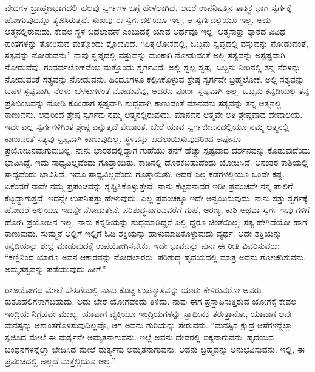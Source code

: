ವೇದಗಳ ಬ್ರಾಹ್ಮಣಭಾಗದಲ್ಲಿ ಹಲವು ಸ್ವರ್ಗಗಳ ಬಗ್ಗೆ ಹೇಳಲಾಗಿದೆ. ಆದರೆ ಉಪನಿಷತ್ತಿನ ತಾತ್ತ್ವಿಕ ಭಾಗ ಸ್ವರ್ಗಕ್ಕೆ ಹೋಗುವುದನ್ನೂ ತ್ಯಜಿಸಿರುತ್ತದೆ. ಸುಖವು ಈ ಸ್ವರ್ಗದಲ್ಲಿಯೂ ಇಲ್ಲ, ಆ ಸ್ವರ್ಗದಲ್ಲಿಯೂ ಇಲ್ಲ. ಅದು ಆತ್ಮನಲ್ಲಿರುವುದು. ಕೇವಲ ಸ್ಥಳ ಬದಲಾವಣೆ ಎಂಬುದಕ್ಕೆ ಯಾವ ಅರ್ಥವೂ ಇಲ್ಲ. ಆತ್ಮಸಾಕ್ಷಾ ತ್ಕಾರದ ವಿವಿಧ ಹಂತಗಳನ್ನು ತೋರಿಸುವ ಮತ್ತೊಂದು ಶ್ಲೋಕವಿದೆ. “ಪಿತೃಲೋಕದಲ್ಲಿ, ಒಬ್ಬನು ಸ್ವಪ್ನದಲ್ಲಿ ವಸ್ತುವನ್ನು ನೋಡುವಂತೆ, ಸತ್ಯವನ್ನು ನೋಡುವನು.” ನಾವು ಸ್ವಪ್ನದಲ್ಲಿ ವಸ್ತುವನ್ನು ಮಂಕಾಗಿ ನೋಡುವಂತೆ ಅಲ್ಲಿ ಸತ್ಯವನ್ನು ಅಸ್ಪಷ್ಟವಾಗಿ ನೋಡುವೆವು. ಗಂಧರ್ವಲೋಕವೆಂಬ ಮತ್ತೊಂದು ಸ್ವರ್ಗವಿದೆ. ಅಲ್ಲಿ ಸ್ವಲ್ಪ ಸ್ವಷ್ಪ; ಒಬ್ಬನು ನೀರಿನಲ್ಲಿ ತನ್ನ ನೆರಳನ್ನು ನೋಡುವಂತೆ ಸತ್ಯವನ್ನು ನೋಡುವನು. ಹಿಂದೂಗಳೂ ಕಲ್ಪಿಸಿಕೊಳ್ಳುವ ಶ್ರೇಷ್ಠ ಸ್ವರ್ಗವೇ ಬ್ರಹ್ಮಲೋಕ. ಅಲ್ಲಿ ಸತ್ಯವನ್ನು ಬಹಳ ಸ್ಪಷ್ಟವಾಗಿ, ನೆರಳು–ಬೆಳಕುಗಳಂತೆ ನೋಡುವೆವು, ಆದರೂ ಪೂರ್ಣ ಸ್ಪಷ್ಟವಾಗಿ ಅಲ್ಲ. ಒಬ್ಬನು ಕನ್ನಡಿಯಲ್ಲಿ ತನ್ನ ಪ್ರತಿಬಿಂಬವನ್ನು ನೋಡಿ ಕೊಂಡಾಗ ಸ್ಪಷ್ಟವಾಗಿ ಶುದ್ಧವಾಗಿ ಕಾಣುವಂತೆ ಮಾನವನು ಸತ್ಯವನ್ನು ತನ್ನ ಆತ್ಮನಲ್ಲಿ ಕಾಣುವನು. ಆದ್ದರಿಂದ ಶ್ರೇಷ್ಠ ಸ್ವರ್ಗವು ನಮ್ಮ ಆತ್ಮನಲ್ಲಿರುವುದು. ಮಾನವನ ಆತ್ಮವೇ ಅತಿ ಶ್ರೇಷ್ಠವಾದ ದೇವಾಲಯ. ಇದೇ ಎಲ್ಲ ಸ್ವರ್ಗಗಳಿಗಿಂತ ಶ್ರೇಷ್ಠ ಎನ್ನುತ್ತದೆ ವೇದಾಂತ. ಬೇರೆ ಯಾವ ಸ್ವರ್ಗಜೀವನದಲ್ಲಿಯೂ ನಮ್ಮ ಆತ್ಮನಲ್ಲಿ ಕಾಣುವಂತೆ ಸತ್ಯವು ಸ್ಪಷ್ಟವಾಗಿ ಕಾಣುವುದಿಲ್ಲ. ಸ್ಥಳವನ್ನು ಬದಲಾಯಿಸುವುದರಿಂದ ಅಷ್ಟೇನೂ ಪ್ರಯೋಜನವಾಗುವುದಿಲ್ಲ. ನಾನು ಭಾರತದಲ್ಲಿದ್ದಾಗ ಗುಹೆಯು ತನಗೆ ಹೆಚ್ಚು ಸ್ಪಷ್ಟವಾದ ದರ್ಶನವನ್ನು ಕೊಡುವುದೆಂದು ಭಾವಿಸಿದ್ದೆ. ಇದು ಸಾಧ್ಯವಿಲ್ಲವೆಂದು ಗೊತ್ತಾಯಿತು. ಕಾಡಿನಲ್ಲಿ ದೊರಕಬಹುದೆಂದು ಯೋಚಿಸಿದೆ. ಅನಂತರ ಕಾಶಿಯಲ್ಲಿ ಸಾಧ್ಯವೆಂದು ಭಾವಿಸಿದೆ. ಇದೂ ಸಾಧ್ಯವಿಲ್ಲವೆಂದು ಗೊತ್ತಾಯಿತು. ಆದರೆ ಎಲ್ಲ ಕಡೆಗಳಲ್ಲಿಯೂ ಒಂದೇ ಕಷ್ಟ. ಏಕೆಂದರೆ ನಾವೇ ನಮ್ಮ ಪ್ರಪಂಚವನ್ನು ಸೃಷ್ಟಿಸಿಕೊಳ್ಳುತ್ತೇವೆ. ನಾನು ಕೆಟ್ಟವನಾದರೆ ಇಡೀ ಪ್ರಪಂಚವೇ ನನ್ನ ಪಾಲಿಗೆ ಕೆಟ್ಟದ್ದಾಗುತ್ತದೆ. ಇದನ್ನೇ ಉಪನಿಷತ್ತು ಹೇಳುವುದು. ಎಲ್ಲ ಪ್ರಪಂಚಕ್ಕೂ ಇದೇ ಅನ್ವಯಿಸುವುದು. ನಾನು ಸತ್ತು ಸ್ವರ್ಗಕ್ಕೆ ಹೋದರೆ ಅಲ್ಲಿಯೂ ಇದನ್ನೇ ನೋಡುತ್ತೇನೆ. ಪರಿಶುದ್ಧನಾಗುವವರೆಗೆ ಗುಹೆ, ಅರಣ್ಯ, ಕಾಶಿ ಅಥವಾ ಸ್ವರ್ಗ ಇವು ಗಳಿಗೆ ಹೋಗಿ ಪ್ರಯೋಜನ ಇಲ್ಲ. ನಾನು ಕನ್ನಡಿಯನ್ನು ಶುದ್ಧಮಾಡಿದ್ದರೆ ಎಲ್ಲಿ ದ್ದರೂ ಚಿಂತೆಯಿಲ್ಲ; ಸತ್ಯ ಹೇಗಿದೆಯೋ ಹಾಗೆ ಕಾಣುವುದು. ಸುಮ್ಮನೆ ಅಲ್ಲಿಗೆ ಇಲ್ಲಿಗೆ ಓಡಿ ಶಕ್ತಿಯನ್ನು ಹಾಳುಮಾಡಿಕೊಳ್ಳುವುದು ವ್ಯರ್ಥ. ಅದೇ ಶಕ್ತಿಯನ್ನು ಕನ್ನಡಿಯನ್ನು ಶುಭ್ರ ಮಾಡುವುದಕ್ಕೆ ಉಪಯೋಗಿಸಬೇಕು. ಇದೇ ಭಾವವನ್ನು ಪುನಃ ಈ ರೀತಿ ವಿವರಿಸುವರು: “ಕಣ್ಣಿನಿಂದ ಯಾರೂ ಅವನ ಆಕಾರವನ್ನು ನೋಡಲಾರರು. ಪರಿಶುದ್ಧ ಹೃದಯದಲ್ಲಿ ಮಾತ್ರ ಅವನು ಗೋಚರಿಸುವನು. ಅಮೃತತ್ವವನ್ನು ಪಡೆಯುವುದು ಹೀಗೆ.”

ರಾಜಯೋಗದ ಮೇಲೆ ಬೇಸಿಗೆಯಲ್ಲಿ ನಾನು ಕೊಟ್ಟ ಉಪನ್ಯಾಸವನ್ನು ಯಾರು ಕೇಳಿರುವರೋ ಅವರು ಕುತೂಹಲಿಗಳಾಗಬಹುದು, ಅದು ಬೇರೆ ಯೋಗವೆಂದು ತಿಳಿದು. ನಾವು ಈಗ ಪ್ರಸ್ತಾಪಿಸುತ್ತಿರುವ ಯೋಗಕ್ಕೆ ಕೇವಲ ಇಂದ್ರಿಯ ನಿಗ್ರಹವೇ ಮುಖ್ಯ. ಯಾವಾಗ ವ್ಯಕ್ತಿಯೂ ಇಂದ್ರಿಯಗಳನ್ನು ಸ್ವಾಧೀನಕ್ಕೆ ತರುತ್ತಾನೋ, ಯಾವಾಗ ಅವು ಮನಸ್ಸನ್ನು ಅಶಾಂತಗೊಳಿಸುವುದಿಲ್ಲವೊ, ಆಗ ಅವನು ಗುರಿಯನ್ನು ಸೇರುವನು. “ಮನಸ್ಸಿನ ಕ್ಷುದ್ರ ಆಸೆಗಳನ್ನೆಲ್ಲಾ ತ್ಯಜಿಸಿದ ಮೇಲೆ ಈ ಮರ್ತ್ಯನೇ ಅಮೃತನಾಗುವನು. ಇಲ್ಲೆ ಅವನು ದೇವರಲ್ಲಿ ಐಕ್ಯನಾಗುವನು. ಹೃದಯದ ಬಂಧನಗಳನ್ನೆಲ್ಲಾ ಭೇದಿಸಿದ ಮೇಲೆ ಮರ್ತ್ಯನು ಅಮೃತನಾಗುವನು. ಅವನು ಬ್ರಹ್ಮವನ್ನು ಅನುಭವಿಸುವನು. ಇಲ್ಲಿ, ಈ ಪ್ರಪಂಚದಲ್ಲಿ ಅಲ್ಲದೆ ಮತ್ತೆಲ್ಲಿಯೂ ಅಲ್ಲ.”

